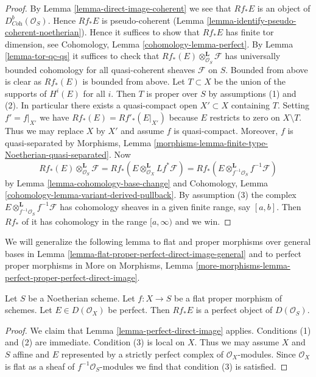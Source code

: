 \begin{proof}
By Lemma \ref{lemma-direct-image-coherent} we see that $Rf_*E$ is an object of
$D^b_{\textit{Coh}}(\mathcal{O}_S)$. Hence $Rf_*E$ is pseudo-coherent
(Lemma \ref{lemma-identify-pseudo-coherent-noetherian}).
Hence it suffices to show that $Rf_*E$ has finite tor dimension, see
Cohomology, Lemma \ref{cohomology-lemma-perfect}.
By Lemma \ref{lemma-tor-qc-qs} it suffices to check that
$Rf_*(E) \otimes_{\mathcal{O}_S}^\mathbf{L} \mathcal{F}$
has universally bounded cohomology for all quasi-coherent
sheaves $\mathcal{F}$ on $S$. Bounded from above is clear as $Rf_*(E)$
is bounded from above. Let $T \subset X$ be the union of the supports
of $H^i(E)$ for all $i$. Then $T$ is proper over $S$ by assumptions (1)
and (2). In particular there exists a quasi-compact open
$X' \subset X$ containing $T$. Setting $f' = f|_{X'}$ we have
$Rf_*(E) = Rf'_*(E|_{X'})$ because $E$ restricts to zero on $X \setminus T$.
Thus we may replace $X$ by $X'$ and assume $f$ is quasi-compact.
Moreover, $f$ is quasi-separated by Morphisms, Lemma
\ref{morphisms-lemma-finite-type-Noetherian-quasi-separated}. Now
$$
Rf_*(E) \otimes_{\mathcal{O}_S}^\mathbf{L} \mathcal{F} =
Rf_*\left(E \otimes_{\mathcal{O}_X}^\mathbf{L} Lf^*\mathcal{F}\right) =
Rf_*\left(E \otimes_{f^{-1}\mathcal{O}_S}^\mathbf{L} f^{-1}\mathcal{F}\right)
$$
by
Lemma \ref{lemma-cohomology-base-change}
and
Cohomology, Lemma \ref{cohomology-lemma-variant-derived-pullback}.
By assumption (3) the complex
$E \otimes_{f^{-1}\mathcal{O}_S}^\mathbf{L} f^{-1}\mathcal{F}$
has cohomology sheaves in a
given finite range, say $[a, b]$. Then $Rf_*$ of it
has cohomology in the range $[a, \infty)$ and we win.
\end{proof}

\noindent
We will generalize the following lemma to flat and proper morphisms
over general bases in
Lemma \ref{lemma-flat-proper-perfect-direct-image-general}
and to perfect proper morphisms in
More on Morphisms, Lemma
\ref{more-morphisms-lemma-perfect-proper-perfect-direct-image}.

\begin{lemma}
\label{lemma-flat-proper-perfect-direct-image}
Let $S$ be a Noetherian scheme. Let $f : X \to S$ be a flat proper
morphism of schemes. Let $E \in D(\mathcal{O}_X)$ be perfect. Then
$Rf_*E$ is a perfect object of $D(\mathcal{O}_S)$.
\end{lemma}

\begin{proof}
We claim that Lemma \ref{lemma-perfect-direct-image} applies.
Conditions (1) and (2) are immediate. Condition (3) is local
on $X$. Thus we may assume $X$ and $S$ affine and $E$
represented by a strictly perfect complex of $\mathcal{O}_X$-modules.
Since $\mathcal{O}_X$ is flat as a sheaf of $f^{-1}\mathcal{O}_S$-modules
we find that condition (3) is satisfied.
\end{proof}






